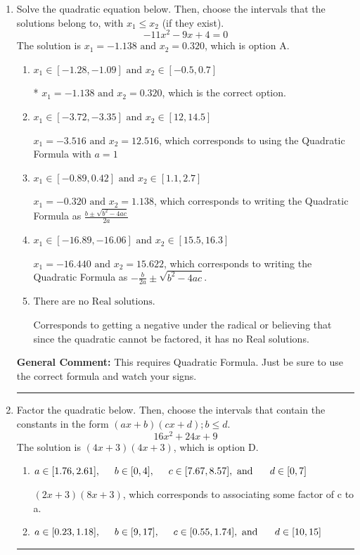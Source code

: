 \documentclass{extbook}[14pt]
\newcommand{\litem}[1]{\item #1

\rule{\textwidth}{0.4pt}}
\begin{document}
\begin{enumerate}\litem{
Solve the quadratic equation below. Then, choose the intervals that the solutions belong to, with $x_1 \leq x_2$ (if they exist).
\[ -11x^{2} -9 x + 4 = 0 \]The solution is \( x_1 = -1.138 \text{ and } x_2 = 0.320 \), which is option A.\begin{enumerate}[label=\Alph*.]
\item \( x_1 \in [-1.28, -1.09] \text{ and } x_2 \in [-0.5, 0.7] \)

* $x_1 = -1.138 \text{ and } x_2 = 0.320$, which is the correct option.
\item \( x_1 \in [-3.72, -3.35] \text{ and } x_2 \in [12, 14.5] \)

 $x_1 = -3.516 \text{ and } x_2 = 12.516$, which corresponds to using the Quadratic Formula with $a=1$
\item \( x_1 \in [-0.89, 0.42] \text{ and } x_2 \in [1.1, 2.7] \)

 $x_1 = -0.320 \text{ and } x_2 = 1.138$, which corresponds to writing the Quadratic Formula as $\frac{b \pm \sqrt{b^2 - 4ac}}{2a}$
\item \( x_1 \in [-16.89, -16.06] \text{ and } x_2 \in [15.5, 16.3] \)

 $x_1 = -16.440 \text{ and } x_2 = 15.622$, which corresponds to writing the Quadratic Formula as $-\frac{b}{2a} \pm \sqrt{b^2 - 4ac}$.
\item \( \text{There are no Real solutions.} \)

Corresponds to getting a negative under the radical or believing that since the quadratic cannot be factored, it has no Real solutions.
\end{enumerate}

\textbf{General Comment:} This requires Quadratic Formula. Just be sure to use the correct formula and watch your signs.
}
\litem{
Factor the quadratic below. Then, choose the intervals that contain the constants in the form $(ax+b)(cx+d); b \leq d.$
\[ 16x^{2} +24 x + 9 \]The solution is \( (4x + 3)(4x + 3) \), which is option D.\begin{enumerate}[label=\Alph*.]
\item \( a \in [1.76, 2.61], \hspace*{5mm} b \in [0, 4], \hspace*{5mm} c \in [7.67, 8.57], \text{ and } \hspace*{5mm} d \in [0, 7] \)

 $(2x + 3)(8x + 3)$, which corresponds to associating some factor of c to a.
\item \( a \in [0.23, 1.18], \hspace*{5mm} b \in [9, 17], \hspace*{5mm} c \in [0.55, 1.74], \text{ and } \hspace*{5mm} d \in [10, 15] \)


\end{enumerate}}
\end{enumerate}
\end{document}

